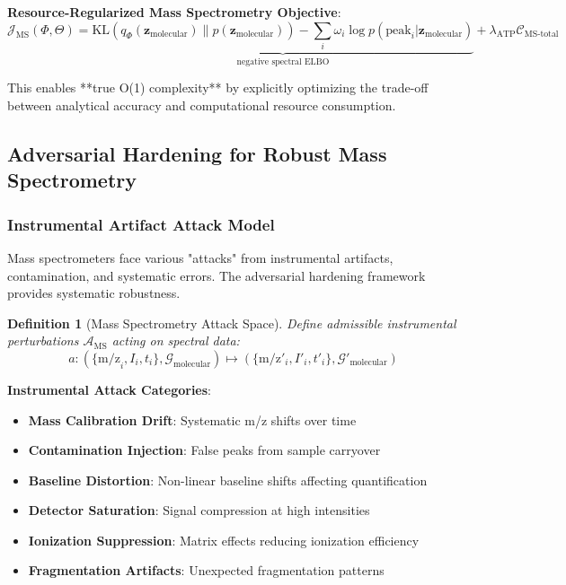 \documentclass[11pt,a4paper]{article}
\newtheorem{definition}[theorem]{Definition}
\theoremstyle{remark}
\begin{document}
\textbf{Resource-Regularized Mass Spectrometry Objective}:
\begin{equation}
\mathcal{J}_{\text{MS}}(\Phi,\Theta) = \underbrace{\text{KL}(q_{\Phi}(\mathbf{z}_{\text{molecular}}) \| p(\mathbf{z}_{\text{molecular}})) - \sum_i \omega_i \log p(\text{peak}_i | \mathbf{z}_{\text{molecular}})}_{\text{negative spectral ELBO}} + \lambda_{\text{ATP}} \mathcal{C}_{\text{MS-total}}
\end{equation}

This enables **true O(1) complexity** by explicitly optimizing the trade-off between analytical accuracy and computational resource consumption.

\subsection{Adversarial Hardening for Robust Mass Spectrometry}

\subsubsection{Instrumental Artifact Attack Model}

Mass spectrometers face various "attacks" from instrumental artifacts, contamination, and systematic errors. The adversarial hardening framework provides systematic robustness.

\begin{definition}[Mass Spectrometry Attack Space]
Define admissible instrumental perturbations $\mathcal{A}_{\text{MS}}$ acting on spectral data:
\begin{equation}
a: (\{\text{m/z}_i, I_i, t_i\}, \mathcal{G}_{\text{molecular}}) \mapsto (\{\text{m/z}'_i, I'_i, t'_i\}, \mathcal{G}'_{\text{molecular}})
\end{equation}
\end{definition}

\textbf{Instrumental Attack Categories}:
\begin{itemize}
\item \textbf{Mass Calibration Drift}: Systematic m/z shifts over time
\item \textbf{Contamination Injection}: False peaks from sample carryover
\item \textbf{Baseline Distortion}: Non-linear baseline shifts affecting quantification
\item \textbf{Detector Saturation}: Signal compression at high intensities
\item \textbf{Ionization Suppression}: Matrix effects reducing ionization efficiency
\item \textbf{Fragmentation Artifacts}: Unexpected fragmentation patterns
\end{itemize}
\end{document}
